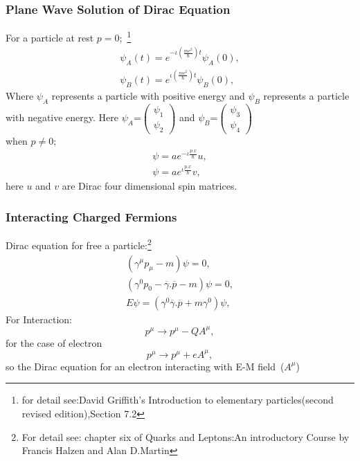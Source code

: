 \subsubsection{Plane Wave Solution of Dirac Equation}
For a particle at rest $p=0$;~\footnote{for detail see:David Griffith's Introduction to elementary particles(second revised edition),Section 7.2}
\begin{eqnarray}
\psi_{A}(t)=e^{-\iota(\frac{mc^{2}}{\hbar})t}\psi_{A}(0),\\
\psi_{B}(t)=e^{\iota(\frac{mc^{2}}{\hbar})t}\psi_{B}(0),
\end{eqnarray}
Where $\psi_{A}$ represents a particle with positive energy and $\psi_{B}$ represents a particle with negative energy.
Here $\psi_{A}$=$\begin{pmatrix}
\psi_{1}\\
\psi_{2}
\end{pmatrix}$
and $\psi_{B}$=$\begin{pmatrix}
\psi_{3}\\
\psi_{4}
\end{pmatrix}$\\
when $p\neq0$;
\begin{eqnarray}
\psi=a e^{-\iota\frac{p.x}{\hbar}}u,\\
\psi=a e^{\iota\frac{p.x}{\hbar}}v,
\end{eqnarray}
here $u$ and $v$ are Dirac four dimensional spin matrices.
\subsubsection{Interacting Charged Fermions}
Dirac equation for free a particle:\footnote{For detail see: chapter six of Quarks and Leptons:An introductory Course by Francis Halzen and Alan D.Martin}
\begin{eqnarray}
(\gamma^{\mu}p_{\mu}-m)\psi=0,\\
(\gamma^{0}p_{0}-\overline{\gamma}.\overline{p}-m)\psi=0,\\
E\psi=(\gamma^{0}\overline{\gamma}.\overline{p}+m\gamma^{0})\psi,
\end{eqnarray}
For Interaction:
\begin{equation}
p^{\mu}\rightarrow p^{\mu}-QA^{\mu},
\end{equation}
for the case of electron
\begin{equation}
p^{\mu}\rightarrow p^{\mu}+eA^{\mu},
\end{equation}
so the Dirac equation for an electron interacting with E-M field~($A^{\mu}$)\\

